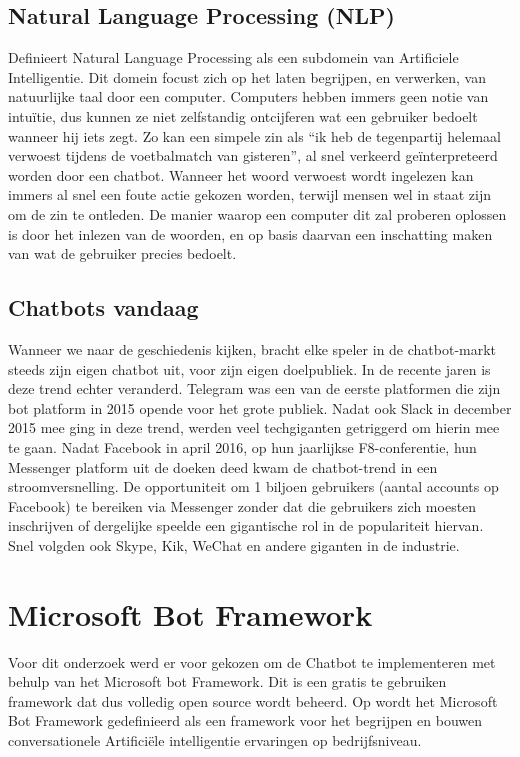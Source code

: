 \subsection{Natural Language Processing (NLP)}
\textcite{Seif2018} Definieert Natural Language Processing als een subdomein van Artificiele Intelligentie. Dit domein focust zich op het laten begrijpen, en verwerken, van natuurlijke taal door een computer. Computers hebben immers geen notie van intuïtie, dus kunnen ze niet zelfstandig ontcijferen wat een gebruiker bedoelt wanneer hij iets zegt. Zo kan een simpele zin als “ik heb de tegenpartij helemaal verwoest tijdens de voetbalmatch van gisteren”, al snel verkeerd geïnterpreteerd worden door een chatbot. Wanneer het woord verwoest wordt ingelezen kan immers al snel een foute actie gekozen worden, terwijl mensen wel in staat zijn om de zin te ontleden. De manier waarop een computer dit zal proberen oplossen is door het inlezen van de woorden, en op basis daarvan een inschatting maken van wat de gebruiker precies bedoelt. 

\subsection{Chatbots vandaag}
Wanneer we naar de geschiedenis kijken, bracht elke speler in de chatbot-markt steeds zijn eigen chatbot uit, voor zijn eigen doelpubliek. In de recente jaren is deze trend echter veranderd. Telegram was een van de eerste platformen die zijn bot platform in 2015 opende voor het grote publiek. Nadat ook Slack in december 2015 mee ging in deze trend, werden veel techgiganten getriggerd om hierin mee te gaan. Nadat Facebook in april 2016, op hun jaarlijkse F8-conferentie, hun Messenger platform uit de doeken deed kwam de chatbot-trend in een stroomversnelling. De opportuniteit om 1 biljoen gebruikers (aantal accounts op Facebook) te bereiken  via Messenger zonder dat die gebruikers zich moesten inschrijven of dergelijke speelde een gigantische rol in de populariteit hiervan. Snel volgden ook Skype, Kik, WeChat en andere giganten in de industrie. 

\section{Microsoft Bot Framework}
Voor dit onderzoek werd er voor gekozen om de Chatbot te implementeren met behulp van het Microsoft bot Framework. Dit is een gratis te gebruiken framework dat dus volledig open source wordt beheerd.   
Op \textcite{Microsoft2019} wordt het Microsoft Bot Framework gedefinieerd als een framework voor het begrijpen en bouwen conversationele Artificiële intelligentie ervaringen op bedrijfsniveau. 

